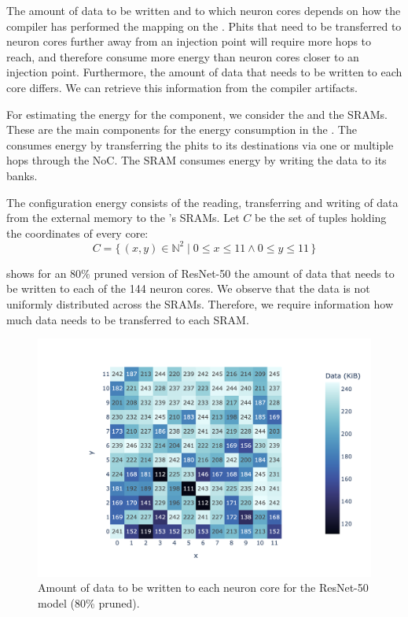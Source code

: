 The amount of data to be written and to which neuron cores depends on how the compiler has performed the mapping on the \graicore{}.
Phits that need to be transferred to neuron cores further away from an injection point will require more hops to reach, and therefore consume more energy than neuron cores closer to an injection point.
Furthermore, the amount of data that needs to be written to each core differs.
We can retrieve this information from the compiler artifacts.

For estimating the energy for the \graicore{} component, we consider the \confignoc{} and the SRAMs.
These are the main components for the energy consumption in the \graicore{}.
The \confignoc{} consumes energy by transferring the phits to its destinations via one or multiple hops through the NoC.
The SRAM consumes energy by writing the data to its banks.

The configuration energy consists of the reading, transferring and writing of data from the external memory to the \graicore{}'s SRAMs. 
Let $C$ be the set of tuples holding the coordinates of every core:
\begin{equation*}
    C = \{\,\left(x,y\right) \in \mathbb{N}^2 \mid 0 \leq x \leq 11 \wedge 0 \leq y \leq 11 \,\} 
\end{equation*}

 shows for an $80\%$ pruned version of ResNet-50 the amount of data that needs to be written to each of the 144 neuron cores.
We observe that the data is not uniformly distributed across the SRAMs.
Therefore, we require information how much data needs to be transferred to each SRAM.

\begin{figure}[hbtp]
    \centering
    \includegraphics[clip, trim=80 20 10 30, width=0.8\linewidth]{assets/resnet50_coredata_heatmap.png}
    \caption{Amount of data to be written to each neuron core for the ResNet-50 model (80\% pruned).}
    \label{fig:model_data_heapmap}
\end{figure}

